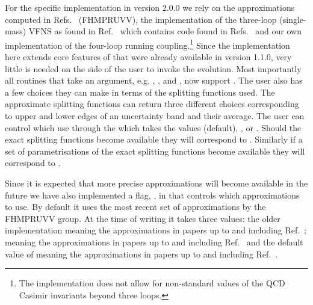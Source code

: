 For the specific implementation in \hoppet version 2.0.0 we rely on
the approximations computed in
Refs.~\cite{Davies:2016jie,Moch:2017uml,Falcioni:2023luc,Falcioni:2023vqq,Moch:2023tdj,Falcioni:2024xyt,Falcioni:2024qpd} (FHMPRUVV),
the implementation of the three-loop (single-mass) VFNS as found in
Ref.~\cite{BlumleinCode} which contains code found in
Refs.~\cite{Ablinger:2024xtt,Fael:2022miw} and our own implementation
of the four-loop running coupling.\footnote{The implementation does
not allow for non-standard values of the QCD Casimir invariants beyond
three loops.}
%
Since the implementation here extends core features of \hoppet that
were already available in version 1.1.0, very little is needed on the
side of the user to invoke the evolution.
%
Most importantly all routines that take an  argument,
e.g. , , and
, now support .
%
The user also has a few choices they can make in terms of the
splitting functions used.
%
The approximate splitting functions can return
three different
choices corresponding to upper and lower edges of an uncertainty band and their
average. 
%
The user can control which use through the
 which takes the values
 (default),
, or
.
%
Should the exact splitting functions become available they will
correspond to .
%
Similarly if a set of parametrisations of the exact splitting
functions become available they will correspond to
.

Since it is expected that more precise approximations will become
available in the future we have also implemented a flag,
, in
 that controls which approximations
to use. By default it uses the most recent set of approximations by
the FHMPRUVV group. At the time of writing it takes three values: the
older implementation
 meaning the
approximations in papers up to and including Ref.~\cite{Moch:2023tdj};
 meaning the
approximations in papers up to and including
Ref.~\cite{Falcioni:2024xyt} and the default value of
 meaning the
approximations in papers up to and including
Ref.~\cite{Falcioni:2024qpd}.



